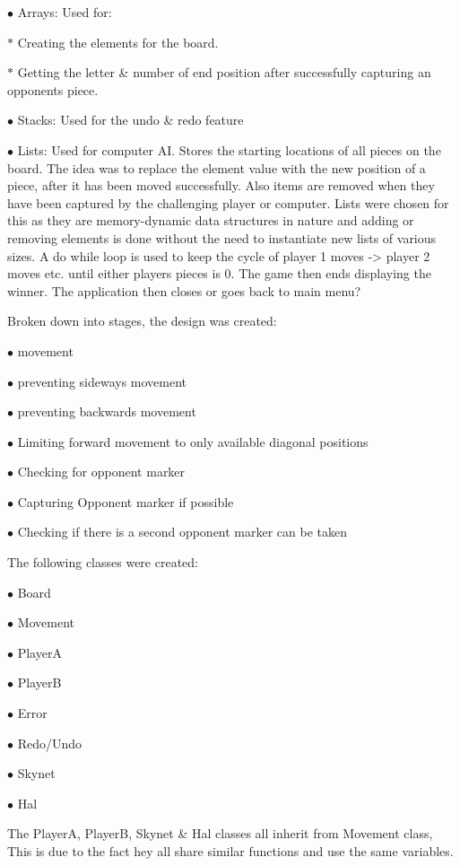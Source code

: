 \documentclass[10pt, a4paper]{article}
\begin{document}
    $\bullet$ Arrays: Used for:
    
    $\ast$ Creating the elements for the board.
    	 
    $\ast$ Getting the letter \& number of end position after successfully capturing an opponents piece.
    
    $\bullet$ Stacks: 
    Used for the undo \& redo feature
    
    $\bullet$ Lists:
    Used for computer AI.  Stores the starting locations of all pieces on the board. The idea was to replace the element value with the new position of a piece, after it has been moved successfully. Also items are removed when they have been captured by the challenging player or computer. Lists were chosen for this as they are memory-dynamic data structures in nature and adding or removing elements is done without the need to instantiate new lists of various sizes. A do while loop is used to keep the cycle of player 1 moves -> player 2 moves etc. until either players pieces is 0. The game then ends displaying the winner. The application then closes or goes back to main menu?
    
    Broken down into stages, the design was created:
    
    $\bullet$ movement
    
    $\bullet$ preventing sideways movement 
       
    $\bullet$ preventing backwards movement
     
    $\bullet$ Limiting forward movement to only available diagonal positions
    
    $\bullet$ Checking for opponent marker
    
    $\bullet$ Capturing Opponent marker if possible
    
    $\bullet$ Checking if there is a second opponent marker can be taken
    
    The following classes were created:
    
    $\bullet$ Board
    
    $\bullet$ Movement
    
    $\bullet$ PlayerA
    
    $\bullet$ PlayerB
    
    $\bullet$ Error
    
    $\bullet$ Redo/Undo
    
    $\bullet$ Skynet
    
    $\bullet$ Hal
    
    The PlayerA, PlayerB, Skynet \& Hal classes all inherit from Movement class, This is due to the fact hey all share similar functions and use the same variables.
    
\end{document}
